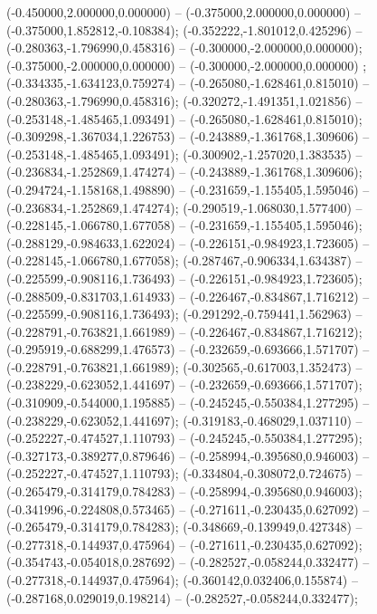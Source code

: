  (-0.450000,2.000000,0.000000) -- (-0.375000,2.000000,0.000000) -- (-0.375000,1.852812,-0.108384);
 (-0.352222,-1.801012,0.425296) -- (-0.280363,-1.796990,0.458316) -- (-0.300000,-2.000000,0.000000);
 (-0.375000,-2.000000,0.000000) -- (-0.300000,-2.000000,0.000000) ;
 (-0.334335,-1.634123,0.759274) -- (-0.265080,-1.628461,0.815010) -- (-0.280363,-1.796990,0.458316);
 (-0.320272,-1.491351,1.021856) -- (-0.253148,-1.485465,1.093491) -- (-0.265080,-1.628461,0.815010);
 (-0.309298,-1.367034,1.226753) -- (-0.243889,-1.361768,1.309606) -- (-0.253148,-1.485465,1.093491);
 (-0.300902,-1.257020,1.383535) -- (-0.236834,-1.252869,1.474274) -- (-0.243889,-1.361768,1.309606);
 (-0.294724,-1.158168,1.498890) -- (-0.231659,-1.155405,1.595046) -- (-0.236834,-1.252869,1.474274);
 (-0.290519,-1.068030,1.577400) -- (-0.228145,-1.066780,1.677058) -- (-0.231659,-1.155405,1.595046);
 (-0.288129,-0.984633,1.622024) -- (-0.226151,-0.984923,1.723605) -- (-0.228145,-1.066780,1.677058);
 (-0.287467,-0.906334,1.634387) -- (-0.225599,-0.908116,1.736493) -- (-0.226151,-0.984923,1.723605);
 (-0.288509,-0.831703,1.614933) -- (-0.226467,-0.834867,1.716212) -- (-0.225599,-0.908116,1.736493);
 (-0.291292,-0.759441,1.562963) -- (-0.228791,-0.763821,1.661989) -- (-0.226467,-0.834867,1.716212);
 (-0.295919,-0.688299,1.476573) -- (-0.232659,-0.693666,1.571707) -- (-0.228791,-0.763821,1.661989);
 (-0.302565,-0.617003,1.352473) -- (-0.238229,-0.623052,1.441697) -- (-0.232659,-0.693666,1.571707);
 (-0.310909,-0.544000,1.195885) -- (-0.245245,-0.550384,1.277295) -- (-0.238229,-0.623052,1.441697);
 (-0.319183,-0.468029,1.037110) -- (-0.252227,-0.474527,1.110793) -- (-0.245245,-0.550384,1.277295);
 (-0.327173,-0.389277,0.879646) -- (-0.258994,-0.395680,0.946003) -- (-0.252227,-0.474527,1.110793);
 (-0.334804,-0.308072,0.724675) -- (-0.265479,-0.314179,0.784283) -- (-0.258994,-0.395680,0.946003);
 (-0.341996,-0.224808,0.573465) -- (-0.271611,-0.230435,0.627092) -- (-0.265479,-0.314179,0.784283);
 (-0.348669,-0.139949,0.427348) -- (-0.277318,-0.144937,0.475964) -- (-0.271611,-0.230435,0.627092);
 (-0.354743,-0.054018,0.287692) -- (-0.282527,-0.058244,0.332477) -- (-0.277318,-0.144937,0.475964);
 (-0.360142,0.032406,0.155874) -- (-0.287168,0.029019,0.198214) -- (-0.282527,-0.058244,0.332477);
